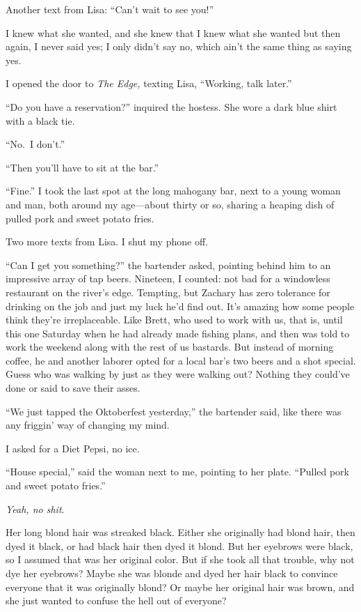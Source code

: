 Another text from Lisa: ``Can't wait to see you!''

I knew what she wanted, and she knew that I knew what she wanted but
then again, I never said yes; I only didn't say no, which ain't the same
thing as saying yes.

I opened the door to \emph{The Edge,} texting Lisa, ``Working, talk
later.''

``Do you have a reservation?'' inquired the hostess. She wore a dark
blue shirt with a black tie.

``No.~I don't.''

``Then you'll have to sit at the bar.''

``Fine.'' I took the last spot at the long mahogany bar, next to a young
woman and man, both around my age---about thirty or so, sharing a
heaping dish of pulled pork and sweet potato fries.

Two more texts from Lisa. I shut my phone off.

``Can I get you something?'' the bartender asked, pointing behind him to
an impressive array of tap beers. Nineteen, I counted: not bad for a
windowless restaurant on the river's edge. Tempting, but Zachary has
zero tolerance for drinking on the job and just my luck he'd find out.
It's amazing how some people think they're irreplaceable. Like Brett,
who used to work with us, that is, until this one Saturday when he had
already made fishing plans, and then was told to work the weekend along
with the rest of us bastards. But instead of morning coffee, he and
another laborer opted for a local bar's two beers and a shot special.
Guess who was walking by just as they were walking out? Nothing they
could've done or said to save their asses.

``We just tapped the Oktoberfest yesterday,'' the bartender said, like
there was any friggin' way of changing my mind.

I asked for a Diet Pepsi, no ice.

``House special,'' said the woman next to me, pointing to her plate.
``Pulled pork and sweet potato fries.''

\emph{Yeah, no shit}.

Her long blond hair was streaked black. Either she originally had blond
hair, then dyed it black, or had black hair then dyed it blond. But her
eyebrows were black, so I assumed that was her original color. But if
she took all that trouble, why not dye her eyebrows? Maybe she was
blonde and dyed her hair black to convince everyone that it was
originally blond? Or maybe her original hair was brown, and she just
wanted to confuse the hell out of everyone?

